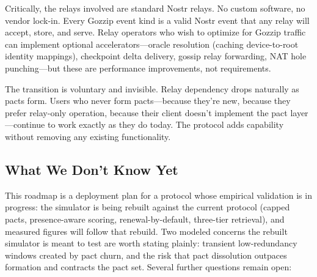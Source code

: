\documentclass[11pt,a4paper]{article}
\begin{document}
Critically, the relays involved are standard Nostr relays. No custom software, no vendor lock-in. Every Gozzip event kind is a valid Nostr event that any relay will accept, store, and serve. Relay operators who wish to optimize for Gozzip traffic can implement optional accelerators---oracle resolution (caching device-to-root identity mappings), checkpoint delta delivery, gossip relay forwarding, NAT hole punching---but these are performance improvements, not requirements.

The transition is voluntary and invisible. Relay dependency drops naturally as pacts form. Users who never form pacts---because they're new, because they prefer relay-only operation, because their client doesn't implement the pact layer---continue to work exactly as they do today. The protocol adds capability without removing any existing functionality.

\subsection{What We Don't Know Yet}

This roadmap is a deployment plan for a protocol whose empirical validation is in progress: the simulator is being rebuilt against the current protocol (capped pacts, presence-aware scoring, renewal-by-default, three-tier retrieval), and measured figures will follow that rebuild. Two modeled concerns the rebuilt simulator is meant to test are worth stating plainly: transient low-redundancy windows created by pact churn, and the risk that pact dissolution outpaces formation and contracts the pact set. Several further questions remain open:
\end{document}
